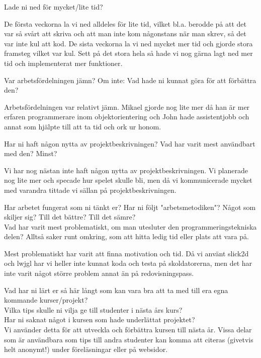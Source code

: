 {\color{red}Lade ni ned för mycket/lite tid?\\}

De första veckorna la vi ned alldeles för lite tid, vilket bl.a. berodde på att det var så svårt att skriva och att man inte kom någonstans när man skrev, så det var inte kul att kod. De sista veckorna la vi ned mycket mer tid och gjorde stora framsteg vilket var kul. Sett på det stora hela så hade vi nog gärna lagt ned mer tid och implementerat mer funktioner.

{\color{red}Var arbetsfördelningen jämn? Om inte: Vad hade ni kunnat göra för att förbättra den?\\}

Arbetsfördelningen var relativt jämn. Mikael gjorde nog lite mer då han är mer erfaren programmerare inom objektorientering och John hade assistentjobb och annat som hjälpte till att ta tid och ork ur honom.

{\color{red}Har ni haft någon nytta av projektbeskrivningen? Vad har varit mest användbart med den? Minst?\\}

Vi har nog nästan inte haft någon nytta av projektbeskrivningen. Vi planerade nog lite mer och specade hur spelet skulle bli, men då vi kommunicerade mycket med varandra tittade vi sällan på projektbeskrivningen. 

{\color{red}Har arbetet fungerat som ni tänkt er? Har ni följt "arbetsmetodiken"? Något som skiljer sig? Till det bättre? Till det sämre?\\}
{\color{red}Vad har varit mest problematiskt, om man utesluter den programmeringstekniska delen? Alltså saker runt omkring, som att hitta ledig tid eller plats att vara på.\\}

Mest problematiskt har varit att finna motivation och tid. Då vi använt slick2d och lwjgl har vi heller inte kunnat koda och testa på skoldatorerna, men det har inte varit något större problem annat än på redovisningspass.

{\color{red}Vad har ni lärt er så här långt som kan vara bra att ta med till era egna kommande kurser/projekt?\\
Vilka tips skulle ni vilja ge till studenter i nästa års kurs?\\
Har ni saknat något i kursen som hade underlättat projektet?\\}
\vspace{11pt}
{\color{red}Vi använder detta för att utveckla och förbättra kursen till nästa år.  Vissa delar som är användbara som tips till andra studenter kan komma att citeras (givetvis helt anonymt!) under föreläsningar eller på websidor.\\}
